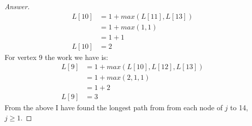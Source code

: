\documentclass[11pt]{article}
\theoremstyle{definition}
\theoremstyle{definition}
\theoremstyle{definition}
\begin{document}
\begin{proof}[Answer]
\begin{align*}
L[10] &= 1 + max(L[11], L[13]) \\
&= 1 + max(1, 1) \\
&= 1 + 1 \\
L[10] &= 2
\end{align*}
For vertex 9 the work we have is: \\
\begin{align*}
L[9] &= 1 + max(L[10], L[12], L[13]) \\
&= 1 + max(2, 1, 1) \\
&= 1 + 2 \\
L[9] &= 3
\end{align*}
From the above I have found the longest path from from each node of $j$ to 14, $j \geq 1$. 
\end{proof}

\end{document}
